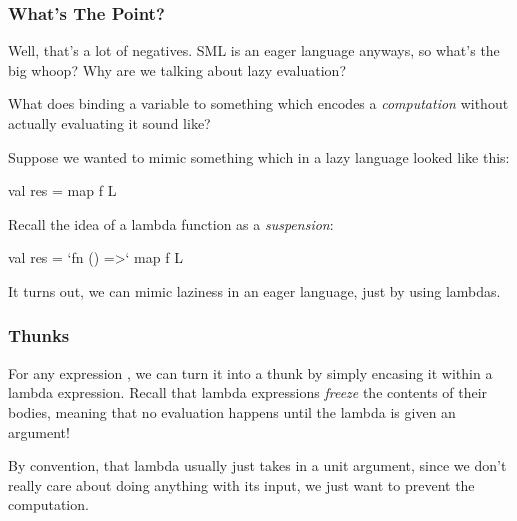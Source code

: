 \documentclass[aspectratio=169, handout]{beamer}
\begin{document}
\begin{frame}[fragile]
  \frametitle{What's The Point?}

  Well, that's a lot of negatives. SML is an eager language anyways, so what's
  the big whoop? Why are we talking about lazy evaluation?

  \pause
  \vspace{\fill}

  What does binding a variable to something which encodes a \textit{computation}
  without actually evaluating it sound like?

  \pause
  \vspace{\fill}

  Suppose we wanted to mimic something which in a lazy language looked like
  this:
  \begin{codeblock}
    val res = map f L
  \end{codeblock}

  \pause
  \vspace{\fill}

  Recall the idea of a lambda function as a \textit{suspension}:
  \begin{codeblock}
    val res = `fn () =>` map f L
  \end{codeblock}

  \pause
  \vspace{\fill}

  It turns out, we can mimic laziness in an eager language, just by using
  lambdas.
\end{frame}

\begin{frame}[fragile]
  \frametitle{Thunks}


  \pause
  \vspace{\fill}

  For any expression , we can turn it into a thunk by simply encasing
  it within a lambda expression. Recall that lambda expressions \textit{freeze}
  the contents of their bodies, meaning that no evaluation happens until the
  lambda is given an argument!

  \pause
  \vspace{\fill}


  \pause
  \vspace{\fill}

  By convention, that lambda usually just takes in a unit argument,
  since we don't really care about doing anything with its input, we just
  want to prevent the computation.
\end{frame}
\end{document}
